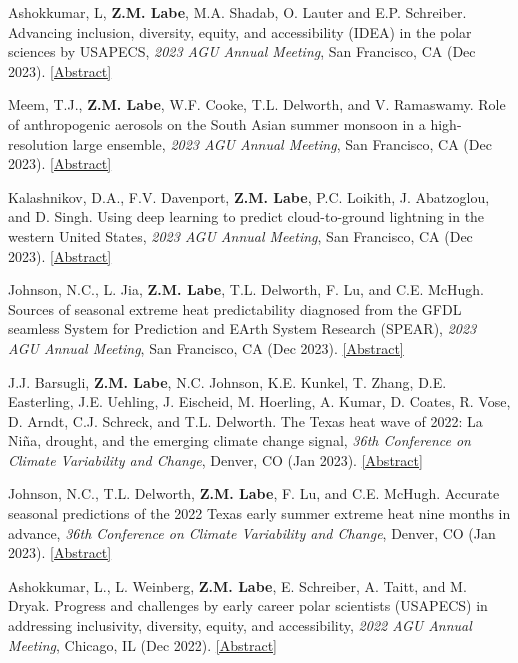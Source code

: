 \documentclass[margin,line,palatino,courier,10pt]{res}
\begin{document}
\begin{resume}
\begin{etaremune}[leftmargin=0in,topsep=0in,parsep=0in]
\item Ashokkumar, L, \textbf{Z.M. Labe}, M.A. Shadab, O. Lauter and E.P. Schreiber. Advancing inclusion, diversity, equity, and accessibility (IDEA) in the polar sciences by USAPECS, \textit{2023 AGU Annual Meeting}, San Francisco, CA (Dec 2023). \href{https://agu.confex.com/agu/fm23/meetingapp.cgi/Paper/1431736}{[Abstract]}
\item Meem, T.J., \textbf{Z.M. Labe}, W.F. Cooke, T.L. Delworth, and V. Ramaswamy. Role of anthropogenic aerosols on the South Asian summer monsoon in a high-resolution large ensemble, \textit{2023 AGU Annual Meeting}, San Francisco, CA (Dec 2023). \href{https://agu.confex.com/agu/fm23/meetingapp.cgi/Paper/1291065}{[Abstract]}
\item Kalashnikov, D.A., F.V. Davenport, \textbf{Z.M. Labe}, P.C. Loikith, J. Abatzoglou, and D. Singh. Using deep learning to predict cloud-to-ground lightning in the western United States, \textit{2023 AGU Annual Meeting}, San Francisco, CA (Dec 2023). \href{https://agu.confex.com/agu/fm23/meetingapp.cgi/Paper/1331607}{[Abstract]}
\item Johnson, N.C., L. Jia, \textbf{Z.M. Labe}, T.L. Delworth, F. Lu, and C.E. McHugh. Sources of seasonal extreme heat predictability diagnosed from the GFDL seamless System for Prediction and EArth System Research (SPEAR), \textit{2023 AGU Annual Meeting}, San Francisco, CA (Dec 2023). \href{https://agu.confex.com/agu/fm23/meetingapp.cgi/Paper/1293219}{[Abstract]}
\item J.J. Barsugli, \textbf{Z.M. Labe}, N.C. Johnson, K.E. Kunkel, T. Zhang, D.E. Easterling, J.E. Uehling, J. Eischeid, M. Hoerling, A. Kumar, D. Coates, R. Vose, D. Arndt, C.J. Schreck, and T.L. Delworth. The Texas heat wave of 2022: La Niña, drought, and the emerging climate change signal, \textit{36th Conference on Climate Variability and Change}, Denver, CO (Jan 2023). \href{https://ams.confex.com/ams/103ANNUAL/meetingapp.cgi/Paper/421815}{[Abstract]}
\item Johnson, N.C., T.L. Delworth, \textbf{Z.M. Labe}, F. Lu, and C.E. McHugh. Accurate seasonal predictions of the 2022 Texas early summer extreme heat nine months in advance, \textit{36th Conference on Climate Variability and Change}, Denver, CO (Jan 2023). \href{https://ams.confex.com/ams/103ANNUAL/meetingapp.cgi/Paper/418044}{[Abstract]}
\item Ashokkumar, L., L. Weinberg, \textbf{Z.M. Labe}, E. Schreiber, A. Taitt, and M. Dryak. Progress and challenges by early career polar scientists (USAPECS) in addressing inclusivity, diversity, equity, and accessibility, \textit{2022 AGU Annual Meeting}, Chicago, IL (Dec 2022). \href{https://agu.confex.com/agu/fm22/meetingapp.cgi/Paper/1192493}{[Abstract]}

\end{etaremune}
\end{resume}
\end{document}
